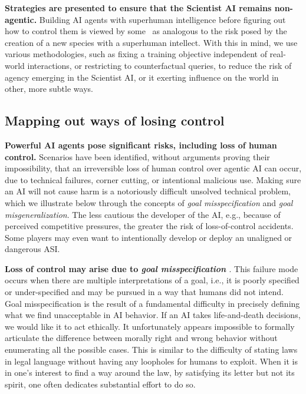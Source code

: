 \textbf{Strategies are presented to ensure that the Scientist AI remains non-agentic.} Building AI agents with superhuman intelligence before figuring out how to control them is viewed by some~\cite{en.wikipedia.org.wiki.Superintelligence..Paths..Dangers..Strategies,tegmark2018life,en.wikipedia.org.wiki.Human.Compatible} as analogous to the risk posed by the creation of a new species with a superhuman intellect. With this in mind, we use various methodologies, such as fixing a training objective independent of real-world interactions, or restricting to counterfactual queries, to reduce the risk of agency emerging in the Scientist AI, or it exerting influence on the world in other, more subtle ways. 

\subsection{Mapping out ways of losing control}

\textbf{Powerful AI agents pose significant risks, including loss of human control.} Scenarios have been identified, without arguments proving their impossibility, that an irreversible loss of human control over agentic AI can occur, due to technical failures, corner cutting, or intentional malicious use. Making sure an AI will not cause harm is a notoriously difficult unsolved technical problem, which we illustrate below through the concepts of \emph{goal misspecification} and \emph{goal misgeneralization}. The less cautious the developer of the AI, e.g., because of perceived competitive pressures, the greater the risk of loss-of-control accidents. Some players may even want to intentionally develop or deploy an unaligned or dangerous ASI.

\textbf{Loss of control may arise due to \emph{goal misspecification} \cite{cset.georgetown.edu.wp.content.uploads.Key.Concepts.in.AI.Safety.Specification.in.Machine.Learning.pdf}}. This failure mode occurs when there are multiple interpretations of a goal, i.e., it is poorly specified or under-specified and may be pursued in a way that humans did not intend. Goal misspecification is the result of a fundamental difficulty in precisely defining what we find unacceptable in AI behavior. If an AI takes life-and-death decisions, we would like it to act ethically. It unfortunately appears impossible to formally articulate the difference between morally right and wrong behavior without enumerating all the possible cases. This is similar to the difficulty of stating laws in legal language without having any loopholes for humans to exploit. When it is in one's interest to find a way around the law, by satisfying its letter but not its spirit, one often dedicates substantial effort to do so.

